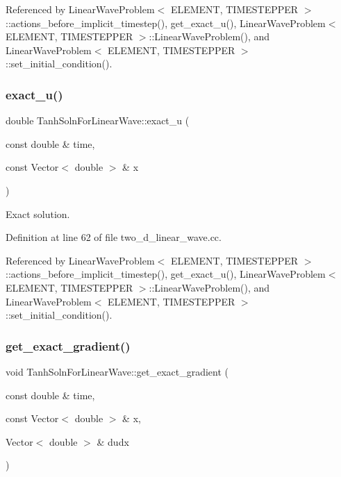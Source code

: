 Referenced by Linear\+Wave\+Problem$<$ E\+L\+E\+M\+E\+N\+T, T\+I\+M\+E\+S\+T\+E\+P\+P\+E\+R $>$\+::actions\+\_\+before\+\_\+implicit\+\_\+timestep(), get\+\_\+exact\+\_\+u(), Linear\+Wave\+Problem$<$ E\+L\+E\+M\+E\+N\+T, T\+I\+M\+E\+S\+T\+E\+P\+P\+E\+R $>$\+::\+Linear\+Wave\+Problem(), and Linear\+Wave\+Problem$<$ E\+L\+E\+M\+E\+N\+T, T\+I\+M\+E\+S\+T\+E\+P\+P\+E\+R $>$\+::set\+\_\+initial\+\_\+condition().

\mbox{\label{namespaceTanhSolnForLinearWave_aceea2935b2d3815ce72aae8c9de2b468}} 
\subsubsection{\texorpdfstring{exact\+\_\+u()}{exact\_u()}}
{\footnotesize\ttfamily double Tanh\+Soln\+For\+Linear\+Wave\+::exact\+\_\+u (\begin{DoxyParamCaption}\item[{const double \&}]{time,  }\item[{const Vector$<$ double $>$ \&}]{x }\end{DoxyParamCaption})}



Exact solution. 



Definition at line 62 of file two\+\_\+d\+\_\+linear\+\_\+wave.\+cc.



Referenced by Linear\+Wave\+Problem$<$ E\+L\+E\+M\+E\+N\+T, T\+I\+M\+E\+S\+T\+E\+P\+P\+E\+R $>$\+::actions\+\_\+before\+\_\+implicit\+\_\+timestep(), get\+\_\+exact\+\_\+u(), Linear\+Wave\+Problem$<$ E\+L\+E\+M\+E\+N\+T, T\+I\+M\+E\+S\+T\+E\+P\+P\+E\+R $>$\+::\+Linear\+Wave\+Problem(), and Linear\+Wave\+Problem$<$ E\+L\+E\+M\+E\+N\+T, T\+I\+M\+E\+S\+T\+E\+P\+P\+E\+R $>$\+::set\+\_\+initial\+\_\+condition().

\mbox{\label{namespaceTanhSolnForLinearWave_af4c104781fc753f17614bcd8ac4fddc8}} 
\subsubsection{\texorpdfstring{get\+\_\+exact\+\_\+gradient()}{get\_exact\_gradient()}}
{\footnotesize\ttfamily void Tanh\+Soln\+For\+Linear\+Wave\+::get\+\_\+exact\+\_\+gradient (\begin{DoxyParamCaption}\item[{const double \&}]{time,  }\item[{const Vector$<$ double $>$ \&}]{x,  }\item[{Vector$<$ double $>$ \&}]{dudx }\end{DoxyParamCaption})}



